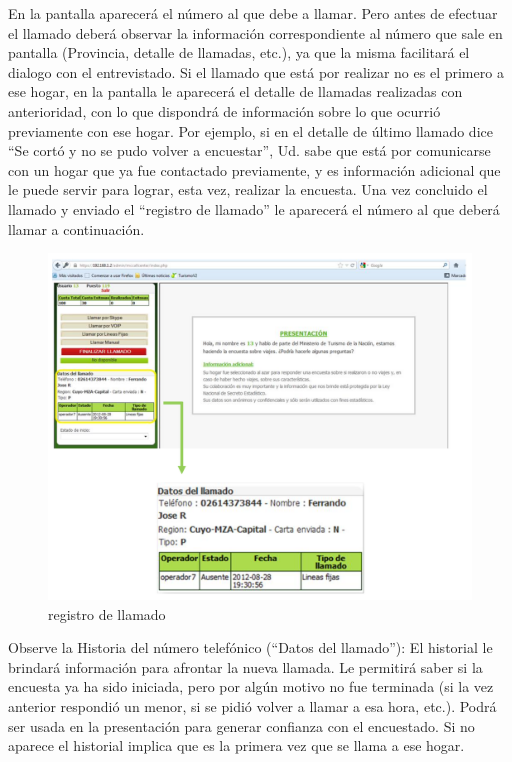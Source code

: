 \documentclass[
  openany]{book}
\begin{document}
En la pantalla aparecerá el número al que debe a llamar. Pero antes de efectuar el llamado deberá observar la información correspondiente al número que sale en pantalla (Provincia, detalle de llamadas, etc.), ya que la misma facilitará el dialogo con el entrevistado. Si el llamado que está por realizar no es el primero a ese hogar, en la pantalla le aparecerá el detalle de llamadas realizadas con anterioridad, con lo que dispondrá de información sobre lo que ocurrió previamente con ese hogar. Por ejemplo, si en el detalle de último llamado dice ``Se cortó y no se pudo volver a encuestar'', Ud. sabe que está por comunicarse con un hogar que ya fue contactado previamente, y es información adicional que le puede servir para lograr, esta vez, realizar la encuesta. Una vez concluido el llamado y enviado el ``registro de llamado'' le aparecerá el número al que deberá llamar a continuación.

\begin{figure}

{\centering \includegraphics[width=1\linewidth]{imagenes/figura6-24} 

}

\caption{registro de llamado}\label{fig:registr}
\end{figure}

Observe la Historia del número telefónico (``Datos del llamado''): El historial le brindará información para afrontar la nueva llamada. Le permitirá saber si la encuesta ya ha sido iniciada, pero por algún motivo no fue terminada (si la vez anterior respondió un menor, si se pidió volver a llamar a esa hora, etc.). Podrá ser usada en la presentación para generar confianza con el encuestado. Si no aparece el historial implica que es la primera vez que se llama a ese hogar.
\end{document}
